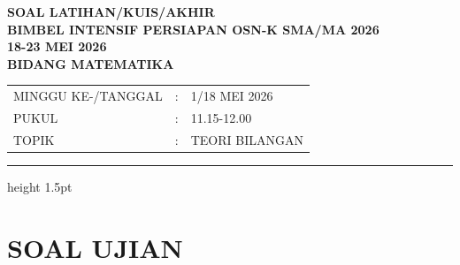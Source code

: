 \documentclass[12pt]{scrartcl}
\begin{document}
\renewcommand*\contentsname{Daftar Isi}
\tableofcontents

\newpage

\begin{center}
    \textbf{SOAL LATIHAN/KUIS/AKHIR} \\
    \textbf{BIMBEL INTENSIF PERSIAPAN OSN-K SMA/MA 2026} \\
    \textbf{18-23 MEI 2026} \\
    \textbf{BIDANG MATEMATIKA} %
\end{center}

\vspace{0.5cm}

\noindent
\begin{tabular}{lll}
    MINGGU KE-/TANGGAL & : &  1/18 MEI 2026\\
    PUKUL              & : &  11.15-12.00\\
    TOPIK              & : & TEORI BILANGAN \\
\end{tabular}

\vspace{0.4cm}
\hrule height 1.5pt
\vspace{0.8cm}

\section*{SOAL UJIAN}
\end{document}
